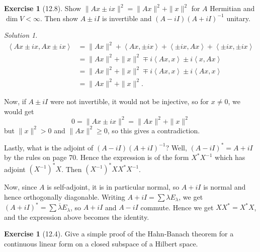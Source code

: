 \documentclass[reqno]{amsart}
\theoremstyle{definition}
\newtheorem{exercise}[theorem]{Exercise}
\theoremstyle{remark}
\newtheorem*{solution}{Solution}
\begin{document}
    \begin{exercise}[12.8]
        Show $\|Ax \pm ix\|^2 = 
        \|Ax\|^2 + \|x\|^2 $ for $A$ Hermitian
        and $\dim V < \infty$. Then show
        $A \pm i I$ is invertible and
        $\left( A - i I \right) \left( A+iI \right)^{-1}$ 
        unitary.
    \end{exercise}

    \begin{solution}

        \begin{align*}
        \left<Ax \pm ix, Ax \pm ix \right> 
        &=
        \|Ax\|^2 + \left< Ax , \pm ix \right>
        + \left< \pm ix, Ax \right>
        + \left<\pm ix, \pm ix \right>
        \\
        &= \|Ax\|^2 + \|x\|^2
        \mp i \left<Ax , x \right>
        \pm i \left< x, Ax \right>\\
        &= \|Ax\|^2 + \|x\|^2
        \mp i \left<Ax,x \right>
        \pm i \left<Ax,x \right>\\
        &= \|Ax\|^2 + \|x\|^2.
        \end{align*}

        Now, if $A \pm i I$ were not invertible, it
        would not be injective, so for 
        $x \neq 0$, we would get
        \[
        0 = \|Ax \pm i x\|^2
        = \|Ax\|^2 + \|x\|^2
        \] 
        but $\|x\|^2 > 0$ and
        $\|Ax\|^2 \ge 0$, so this gives a contradiction.

        Lastly, what is the adjoint of
        $\left( A-iI \right) \left( A+iI \right)^{-1}$?
        Well, $\left( A-iI \right)^{*}
        = A + iI$ by the rules on page 70. Hence
        the expression is of the form
        $X^{*} X^{-1}$ which has adjoint
        $\left( X^{-1} \right)^{*} X$. Then
        $\left( X^{-1} \right)^{*} X X^{*} X^{-1}$.


        Now, since $A$ is self-adjoint, it is in particular
        normal, so $A + iI$ is normal and
        hence orthogonally diagonable. Writing
        $A+ iI = \sum \lambda E_{\lambda}$, we get
        $(A+iI)^{*} = \sum \overline{\lambda} E_{\lambda}$, so
        $A+iI$ and $A-iI$ commute. Hence we get
         $X X^{*} = X^{*} X$, and the expression above becomes
         the identity.
    \end{solution}



    \begin{exercise}[12.4]
        Give a simple proof of the Hahn-Banach theorem for
        a continuous linear form on a closed subspace of
        a Hilbert space.
    \end{exercise}
\end{document}
